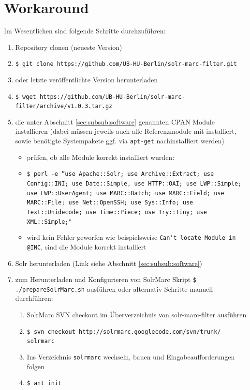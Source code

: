 \documentclass[10pt]{article}
\begin{document}
\section{Workaround}
\label{sec:workaround}
Im Wesentlichen sind folgende Schritte durchzuführen: 
\begin{enumerate}
	\item Repository clonen (neueste Version)
	\item[] \texttt{\$ git clone https://github.com/UB-HU-Berlin/solr-marc-filter.git}
	\item[] oder letzte veröffentlichte Version herunterladen
	\item[] \texttt{\$ wget https://github.com/UB-HU-Berlin/solr-marc-filter/archive/v1.0.3.tar.gz}
	
	\item die unter Abschnitt \ref{sec:subsub:software} genannten CPAN Module installieren (dabei müssen jeweils auch alle Referenzmodule mit installiert, sowie benötigte Systempakete ggf. via \texttt{apt-get} nachinstalliert werden)
	\begin{itemize}
		\item prüfen, ob alle Module korrekt installiert wurden: 
		\item[] \texttt{\$ perl -e ”use Apache::Solr; use Archive::Extract; use Config::INI; use Date::Simple, use HTTP::OAI; use LWP::Simple; use LWP::UserAgent; use MARC::Batch; use MARC::Field; use MARC::File; use Net::OpenSSH; use Sys::Info; use Text::Unidecode; use Time::Piece; use Try::Tiny; use XML::Simple;" }
		\item wird kein Fehler geworfen wie beispielsweise \texttt{Can't locate Module in @INC}, sind die Module korrekt installiert
	\end{itemize}
	\item Solr herunterladen (Link siehe Abschnitt \ref{sec:subsub:software})
	\item zum Herunterladen und Konfigurieren von SolrMarc Skript \texttt{\$ ./prepareSolrMarc.sh} ausführen oder alternativ Schritte manuell durchführen:
	\begin{enumerate}
		\item SolrMarc SVN checkout im Überverzeichnis von solr-marc-filter ausführen
		\item[] \texttt{\$ svn checkout http://solrmarc.googlecode.com/svn/trunk/ solrmarc}
		
		\item Ins Verzeichnis \texttt{solrmarc} wechseln, bauen und Eingabeaufforderungen folgen
		\item[] \texttt{\$ ant init}
		

\end{enumerate}
\end{enumerate}
\end{document}
